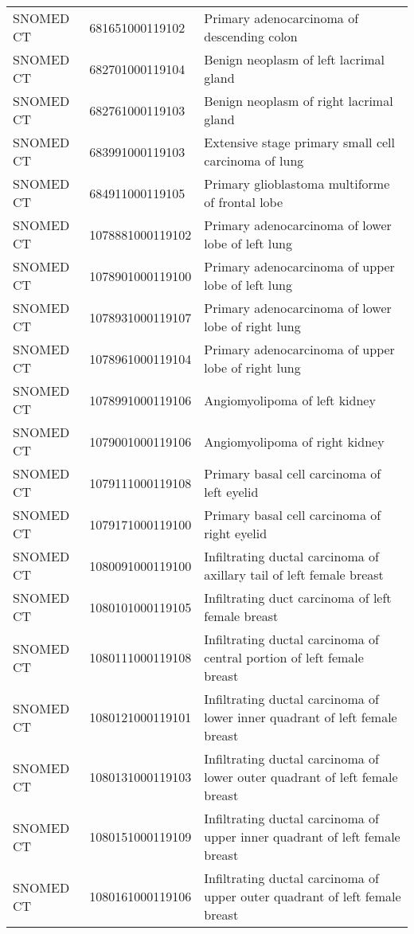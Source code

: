\begin{longtable}{p{}p{}p{}}
  SNOMED CT & 681651000119102 & Primary adenocarcinoma of descending colon \\ 
  SNOMED CT & 682701000119104 & Benign neoplasm of left lacrimal gland \\ 
  SNOMED CT & 682761000119103 & Benign neoplasm of right lacrimal gland \\ 
  SNOMED CT & 683991000119103 & Extensive stage primary small cell carcinoma of lung \\ 
  SNOMED CT & 684911000119105 & Primary glioblastoma multiforme of frontal lobe \\ 
  SNOMED CT & 1078881000119102 & Primary adenocarcinoma of lower lobe of left lung \\ 
  SNOMED CT & 1078901000119100 & Primary adenocarcinoma of upper lobe of left lung \\ 
  SNOMED CT & 1078931000119107 & Primary adenocarcinoma of lower lobe of right lung \\ 
  SNOMED CT & 1078961000119104 & Primary adenocarcinoma of upper lobe of right lung \\ 
  SNOMED CT & 1078991000119106 & Angiomyolipoma of left kidney \\ 
  SNOMED CT & 1079001000119106 & Angiomyolipoma of right kidney \\ 
  SNOMED CT & 1079111000119108 & Primary basal cell carcinoma of left eyelid \\ 
  SNOMED CT & 1079171000119100 & Primary basal cell carcinoma of right eyelid \\ 
  SNOMED CT & 1080091000119100 & Infiltrating ductal carcinoma of axillary tail of left female breast \\ 
  SNOMED CT & 1080101000119105 & Infiltrating duct carcinoma of left female breast \\ 
  SNOMED CT & 1080111000119108 & Infiltrating ductal carcinoma of central portion of left female breast \\ 
  SNOMED CT & 1080121000119101 & Infiltrating ductal carcinoma of lower inner quadrant of left female breast \\ 
  SNOMED CT & 1080131000119103 & Infiltrating ductal carcinoma of lower outer quadrant of left female breast \\ 
  SNOMED CT & 1080151000119109 & Infiltrating ductal carcinoma of upper inner quadrant of left female breast \\ 
  SNOMED CT & 1080161000119106 & Infiltrating ductal carcinoma of upper outer quadrant of left female breast \\ 

\end{longtable}

